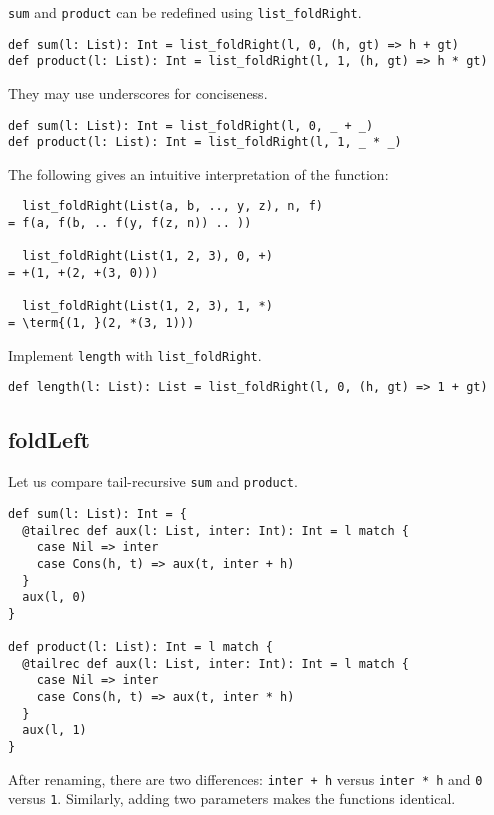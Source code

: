 \verb!sum! and \verb!product! can be redefined using \verb!list_foldRight!.

\begin{verbatim}
def sum(l: List): Int = list_foldRight(l, 0, (h, gt) => h + gt)
def product(l: List): Int = list_foldRight(l, 1, (h, gt) => h * gt)
\end{verbatim}

They may use underscores for conciseness.

\begin{verbatim}
def sum(l: List): Int = list_foldRight(l, 0, _ + _)
def product(l: List): Int = list_foldRight(l, 1, _ * _)
\end{verbatim}

The following gives an intuitive interpretation of the function:

\begin{verbatim}
  list_foldRight(List(a, b, .., y, z), n, f)
= f(a, f(b, .. f(y, f(z, n)) .. ))

  list_foldRight(List(1, 2, 3), 0, +)
= +(1, +(2, +(3, 0)))

  list_foldRight(List(1, 2, 3), 1, *)
= \term{(1, }(2, *(3, 1)))
\end{verbatim}

Implement \verb!length! with \verb!list_foldRight!.

\begin{verbatim}
def length(l: List): List = list_foldRight(l, 0, (h, gt) => 1 + gt)
\end{verbatim}

\subsection{foldLeft}

Let us compare tail-recursive \verb!sum! and \verb!product!.

\begin{verbatim}
def sum(l: List): Int = {
  @tailrec def aux(l: List, inter: Int): Int = l match {
    case Nil => inter
    case Cons(h, t) => aux(t, inter + h)
  }
  aux(l, 0)
}

def product(l: List): Int = l match {
  @tailrec def aux(l: List, inter: Int): Int = l match {
    case Nil => inter
    case Cons(h, t) => aux(t, inter * h)
  }
  aux(l, 1)
}
\end{verbatim}

After renaming, there are two differences: \verb!inter + h! versus \verb!inter * h!
and \verb!0! versus \verb!1!. Similarly, adding two parameters makes the
functions identical.

